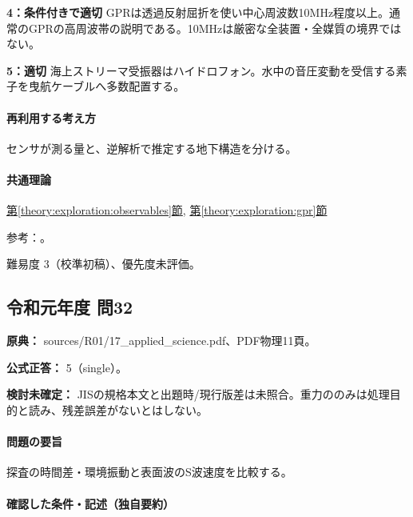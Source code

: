 \noindent\textbf{4：条件付きで適切} GPRは透過反射屈折を使い中心周波数10MHz程度以上。通常のGPRの高周波帯の説明である。10MHzは厳密な全装置・全媒質の境界ではない。\par

\noindent\textbf{5：適切} 海上ストリーマ受振器はハイドロフォン。水中の音圧変動を受信する素子を曳航ケーブルへ多数配置する。\par

\paragraph{再利用する考え方} センサが測る量と、逆解析で推定する地下構造を分ける。

\paragraph{共通理論} \hyperref[theory:exploration:observables]{第\ref*{theory:exploration:observables}節}, \hyperref[theory:exploration:gpr]{第\ref*{theory:exploration:gpr}節}

\par 参考：\cite{gsi_gravity_definitions,usgs_mt_metadata,epa_gpr,usgs_marine_seismic}。

\par 難易度 3（校準初稿）、優先度未評価。

\subsection{令和元年度 問32}
\label{q:r01-reg-applied-32}

\noindent\textbf{原典：} sources/R01/17\_applied\_science.pdf、PDF物理11頁。

\textbf{公式正答：} 5（single）。

\par\textbf{検討未確定：} JISの規格本文と出題時/現行版差は未照合。重力ののみは処理目的と読み、残差誤差がないとはしない。

\paragraph{問題の要旨} 探査の時間差・環境振動と表面波のS波速度を比較する。

\paragraph{確認した条件・記述（独自要約）}\mbox{}\par

